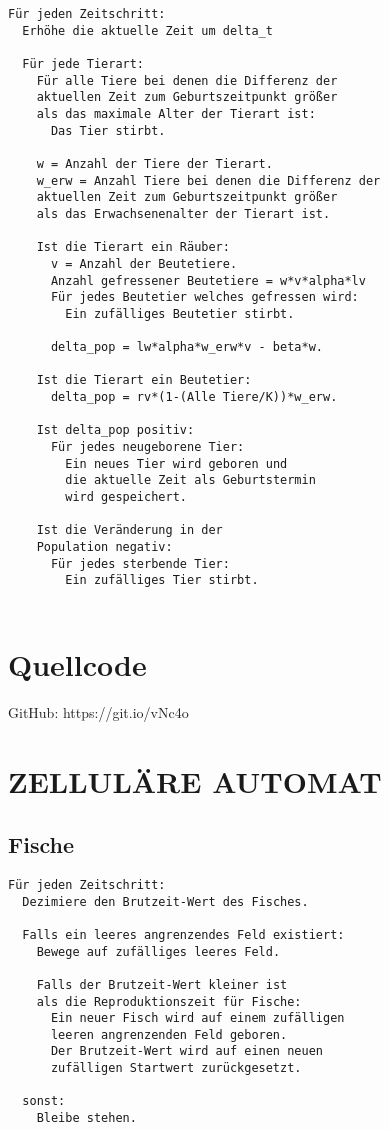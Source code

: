 \documentclass[a4paper]{article}
\begin{document}
	\begin{small}
	\begin{verbatim}
Für jeden Zeitschritt:
  Erhöhe die aktuelle Zeit um delta_t

  Für jede Tierart:
    Für alle Tiere bei denen die Differenz der
    aktuellen Zeit zum Geburtszeitpunkt größer
    als das maximale Alter der Tierart ist:
      Das Tier stirbt.

    w = Anzahl der Tiere der Tierart.
    w_erw = Anzahl Tiere bei denen die Differenz der
    aktuellen Zeit zum Geburtszeitpunkt größer
    als das Erwachsenenalter der Tierart ist.

    Ist die Tierart ein Räuber:
      v = Anzahl der Beutetiere.
      Anzahl gefressener Beutetiere = w*v*alpha*lv
      Für jedes Beutetier welches gefressen wird:
        Ein zufälliges Beutetier stirbt.
            
      delta_pop = lw*alpha*w_erw*v - beta*w.

    Ist die Tierart ein Beutetier:
      delta_pop = rv*(1-(Alle Tiere/K))*w_erw.

    Ist delta_pop positiv:
      Für jedes neugeborene Tier:
        Ein neues Tier wird geboren und 
        die aktuelle Zeit als Geburtstermin 
        wird gespeichert.

    Ist die Veränderung in der
    Population negativ:
      Für jedes sterbende Tier:
        Ein zufälliges Tier stirbt.	
 		
	\end{verbatim}
	\end{small}
	
	\section*{Quellcode}
	\noindent GitHub: https://git.io/vNc4o	
	
	\newpage
	
	\section{\uppercase{Zelluläre Automat}}
	\subsection{Fische}
	\begin{small}
	\begin{verbatim}
Für jeden Zeitschritt:
  Dezimiere den Brutzeit-Wert des Fisches.
 		
  Falls ein leeres angrenzendes Feld existiert:
    Bewege auf zufälliges leeres Feld.
 			
    Falls der Brutzeit-Wert kleiner ist
    als die Reproduktionszeit für Fische:
      Ein neuer Fisch wird auf einem zufälligen
      leeren angrenzenden Feld geboren.
      Der Brutzeit-Wert wird auf einen neuen
      zufälligen Startwert zurückgesetzt.
 			
  sonst:
    Bleibe stehen. 		
 		
	\end{verbatim}
	\end{small}
	
\end{document}
